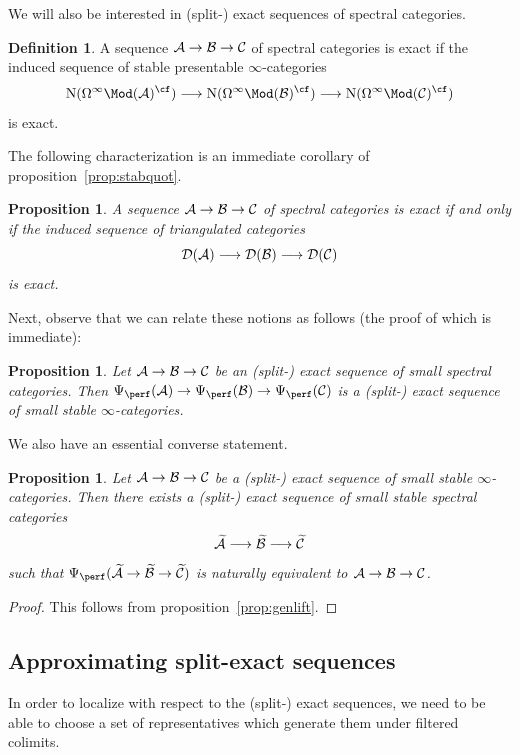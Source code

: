 \documentclass{amsart}
\renewcommand{\to}{\mathchoice{\longrightarrow}{\rightarrow}{\rightarrow}{\rightarrow}}
\let\catsymbfont\mathcal
\newcommand{\aA}{{\catsymbfont{A}}}
\newcommand{\aB}{{\catsymbfont{B}}}
\newcommand{\aC}{{\catsymbfont{C}}}
\newcommand{\aD}{{\catsymbfont{D}}}
\newcommand{\N}{\mathrm{N}}
\renewcommand{\i}{\infty}
\numberwithin{equation}{section}
\newtheorem{proposition}[equation]{Proposition}
\theoremstyle{definition}
\newtheorem{definition}[equation]{Definition}
\begin{document}
We will also be interested in (split-) exact sequences of spectral categories.

\begin{definition}
A sequence $\aA\to\aB\to\aC$ of spectral categories is exact if the
induced sequence of stable presentable $\i$-categories 
\[
\N(\Omega^\infty \Mod(\aA)^{\cf}) \to\N(\Omega^\infty \Mod(\aB)^{\cf}) \to\N(\Omega^\infty \Mod(\aC)^{\cf})
\]
is exact.
\end{definition}

The following characterization is an immediate corollary of proposition~\ref{prop:stabquot}.

\begin{proposition}
A sequence $\aA \to \aB \to \aC$ of spectral categories is exact if
and only if the induced sequence of triangulated categories
\[
\aD(\aA) \to \aD(\aB) \to \aD(\aC)
\]
is exact.
\end{proposition}

Next, observe that we can relate these notions as follows (the proof
of which is immediate):

\begin{proposition}
Let $\aA \to \aB \to \aC$ be an (split-) exact sequence of small spectral
categories.  Then
$\Psi_{\perf}(\aA) \to \Psi_{\perf}(\aB) \to \Psi_{\perf}(\aC)$ is a
(split-) exact sequence of small stable $\i$-categories.
\end{proposition}

We also have an essential converse statement.

\begin{proposition}\label{prop:speclift}
Let $\aA \to \aB \to \aC$ be a (split-) exact sequence of small stable
$\i$-categories.  Then there exists a (split-) exact sequence of small
stable spectral categories
\[
\widetilde{\aA} \to \widetilde{\aB} \to \widetilde{\aC}
\]
such that
$\Psi_{\perf}(\widetilde{\aA} \to \widetilde{\aB} \to \widetilde{\aC})$
is naturally equivalent to $\aA \to \aB \to \aC$.
\end{proposition}

\begin{proof}
This follows from proposition~\ref{prop:genlift}.
\end{proof}

\subsection{Approximating split-exact sequences}

In order to localize with respect to the (split-) exact sequences, we
need to be able to choose a set of representatives which generate them
under filtered colimits.
\end{document}

